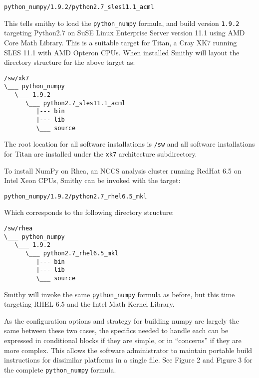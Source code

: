 \documentclass{acm_proc_article-sp}
\begin{document}
\begin{quoting}
\begin{verbatim}
python_numpy/1.9.2/python2.7_sles11.1_acml
\end{verbatim}
\end{quoting}

This tells smithy to load the \texttt{python\_numpy} formula, and build version
\texttt{1.9.2} targeting Python2.7 on SuSE Linux Enterprise Server version 11.1
using AMD Core Math Library. This is a suitable target for Titan, a Cray XK7
running SLES 11.1 with AMD Opteron CPUs. When installed Smithy will layout the
directory structure for the above target as:

\begin{quoting}
\begin{verbatim}
/sw/xk7
\___ python_numpy
   \___ 1.9.2
      \___ python2.7_sles11.1_acml
         |--- bin
         |--- lib
         \___ source
\end{verbatim}
\end{quoting}

The root location for all software installations is \texttt{/sw} and all
software installations for Titan are installed under the \texttt{xk7}
architecture subdirectory.

To install NumPy on Rhea, an NCCS analysis cluster running RedHat 6.5 on Intel
Xeon CPUs, Smithy can be invoked with the target:

\begin{quoting}
\begin{verbatim}
python_numpy/1.9.2/python2.7_rhel6.5_mkl
\end{verbatim}
\end{quoting}

Which corresponds to the following directory structure:

\begin{quoting}
\begin{verbatim}
/sw/rhea
\___ python_numpy
   \___ 1.9.2
      \___ python2.7_rhel6.5_mkl
         |--- bin
         |--- lib
         \___ source
\end{verbatim}
\end{quoting}

Smithy will invoke the same \texttt{python\_numpy} formula as before, but this
time targeting RHEL 6.5 and the Intel Math Kernel Library.

As the configuration options and strategy for building numpy are largely the
same between these two cases, the specifics needed to handle each can be
expressed in conditional blocks if they are simple, or in ``concerns'' if they
are more complex. This allows the software administrator to maintain portable
build instructions for dissimilar platforms in a single file. See
Figure 2 and Figure 3
for the complete \texttt{python\_numpy} formula.
\end{document}
